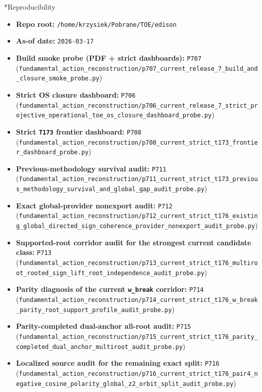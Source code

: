 \documentclass[11pt,a4paper]{article}
\makeatletter
\newcommand{\chapter}{\@ifstar{\section*}{\section}}
\makeatother
\begin{document}
\chapter*{Reproducibility}
\begin{itemize}
  \item \textbf{Repo root:} \verb|/home/krzysiek/Pobrane/TOE/edison|
  \item \textbf{As-of date:} \texttt{2026-03-17}
  \item \textbf{Build smoke probe (PDF + strict dashboards):} \texttt{P707} (\verb|fundamental_action_reconstruction/p707_current_release_7_build_and_closure_smoke_probe.py|)
  \item \textbf{Strict OS closure dashboard:} \texttt{P706} (\verb|fundamental_action_reconstruction/p706_current_release_7_strict_projective_operational_toe_os_closure_dashboard_probe.py|)
  \item \textbf{Strict \texttt{T173} frontier dashboard:} \texttt{P708} (\verb|fundamental_action_reconstruction/p708_current_strict_t173_frontier_dashboard_probe.py|)
  \item \textbf{Previous-methodology survival audit:} \texttt{P711} (\verb|fundamental_action_reconstruction/p711_current_strict_t173_previous_methodology_survival_and_global_gap_audit_probe.py|)
  \item \textbf{Exact global-provider nonexport audit:} \texttt{P712} (\verb|fundamental_action_reconstruction/p712_current_strict_t176_existing_global_directed_sign_coherence_provider_nonexport_audit_probe.py|)
  \item \textbf{Supported-root corridor audit for the strongest current candidate class:} \texttt{P713} (\verb|fundamental_action_reconstruction/p713_current_strict_t176_multiroot_rooted_sign_lift_root_independence_audit_probe.py|)
  \item \textbf{Parity diagnosis of the current \texttt{w\_break} corridor:} \texttt{P714} (\verb|fundamental_action_reconstruction/p714_current_strict_t176_w_break_parity_root_support_profile_audit_probe.py|)
  \item \textbf{Parity-completed dual-anchor all-root audit:} \texttt{P715} (\verb|fundamental_action_reconstruction/p715_current_strict_t176_parity_completed_dual_anchor_multiroot_audit_probe.py|)
  \item \textbf{Localized source audit for the remaining exact split:} \texttt{P716} (\verb|fundamental_action_reconstruction/p716_current_strict_t176_pair4_negative_cosine_polarity_global_z2_orbit_split_audit_probe.py|)

\end{itemize}
\end{document}
